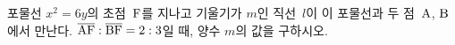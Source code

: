 포물선 $x^2=6y$의 초점~$\mathrm{F}$를 지나고 기울기가 $m$인 직선~$l$이 이 포물선과 두 점~$\mathrm{A}$, $\mathrm{B}$에서 만난다. $\overline{\mathrm{AF}}:\overline{\mathrm{BF}}=2:3$일 때, 양수 $m$의 값을 구하시오. 

